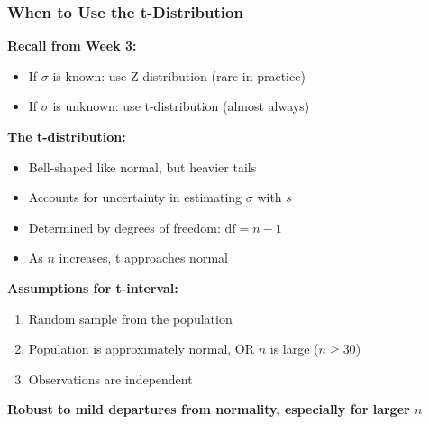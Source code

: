\documentclass{beamer}
\begin{document}
\begin{frame}
\frametitle{When to Use the t-Distribution}
\textbf{Recall from Week 3:}
\begin{itemize}
\item If $\sigma$ is known: use Z-distribution (rare in practice)
\item If $\sigma$ is unknown: use t-distribution (almost always)
\end{itemize}

\vspace{0.5cm}
\textbf{The t-distribution:}
\begin{itemize}
\item Bell-shaped like normal, but heavier tails
\item Accounts for uncertainty in estimating $\sigma$ with $s$
\item Determined by degrees of freedom: $\text{df} = n - 1$
\item As $n$ increases, t approaches normal
\end{itemize}

\vspace{0.5cm}
\textbf{Assumptions for t-interval:}
\begin{enumerate}
\item Random sample from the population
\item Population is approximately normal, OR $n$ is large ($n \geq 30$)
\item Observations are independent
\end{enumerate}

\vspace{0.3cm}
\textbf{Robust to mild departures from normality, especially for larger $n$}
\end{frame}
\end{document}
